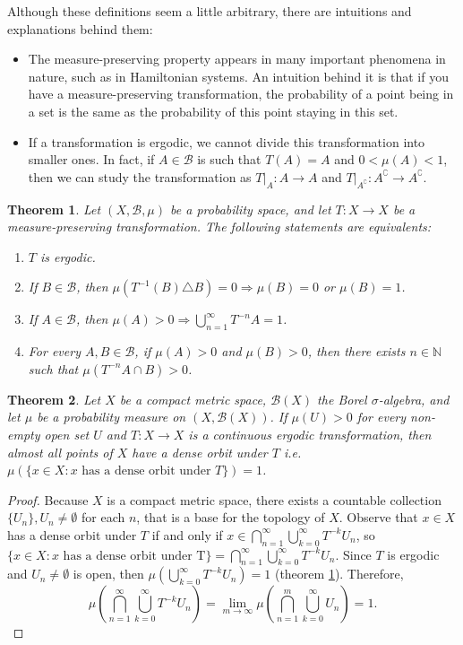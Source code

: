 \documentclass[a4paper]{article}
\theoremstyle{plain}
\newtheorem{theorem}{Theorem}[section] %
\theoremstyle{definition}
\begin{document}
Although these definitions seem a little arbitrary, there are intuitions and explanations behind them: 
\begin{itemize}
    \item The measure-preserving property appears in many important phenomena in nature, such as in Hamiltonian systems. An intuition behind it is that if you have a measure-preserving transformation, the probability of a point being in a set is the same as the probability of this point staying in this set. 
    \item If a transformation is ergodic, we cannot divide this transformation into smaller ones. In fact, if $A\in\mathcal B$ is such that $T(A)=A$ and $0<\mu(A)<1$, then we can study the transformation as $T|_A:A\to A$ and $T|_{A^\complement}:A^\complement\to A^\complement$.
\end{itemize}

\begin{theorem}\label{ergodic-eq}
    Let $(X, \mathcal B, \mu)$  be a probability space, and let $T: X\to X$ be a measure-preserving transformation. The following statements are equivalents:
    \begin{enumerate}
        \item $T$ is ergodic.
        \item If $B\in\mathcal B$, then $\mu(T^{-1}(B)\triangle B)=0\Rightarrow \mu(B)=0$ or $\mu(B)=1$.
        \item If $A\in\mathcal B$, then $\mu(A)>0\Rightarrow \bigcup_{n=1}^\infty T^{-n}A=1$.
        \item For every $A,B\in\mathcal B$, if $\mu(A)>0$ and $\mu(B)>0$, then there exists $n\in\mathbb N$ such that  $\mu(T^{-n}A\cap B)>0$.
    \end{enumerate}
\end{theorem}



\begin{theorem}\label{dense-orbit}
    Let $X$ be a compact metric space, $\mathcal B(X)$ the Borel $\sigma$-algebra, and let $\mu$ be a probability measure on $(X, \mathcal B(X))$. If $\mu(U)>0$ for every non-empty open set $U$ and $T: X\to X$ is a continuous ergodic transformation, then almost all points of $X$ have a dense orbit under $T$ i.e.  $\mu(\{x\in X: x\text{ has a dense orbit under }T\})=1$.
\end{theorem}
\begin{proof}
    Because $X$ is a compact metric space, there exists a countable collection $\{U_n\}, U_n\neq\emptyset$ for each $n$, that is a base for the topology of $X$. Observe that $x\in X$ has a dense orbit under $T$ if and only if $x\in \bigcap_{n=1}^\infty \bigcup_{k=0}^\infty T^{-k}U_n$, so $\{x\in X:x\text{ has a dense orbit under T}\}=\bigcap_{n=1}^\infty \bigcup_{k=0}^\infty T^{-k}U_n$. Since $T$ is ergodic and $U_n\neq\emptyset$ is open, then $\mu(\bigcup_{k=0}^\infty T^{-k} U_n)=1$ (theorem \ref{ergodic-eq}). Therefore, $$\mu(\bigcap_{n=1}^\infty\bigcup_{k=0}^\infty T^{-k}U_n)=\lim_{m\to\infty}\mu(\bigcap_{n=1}^m\bigcup_{k=0}^\infty U_n)=1.$$
\end{proof}
\end{document}
